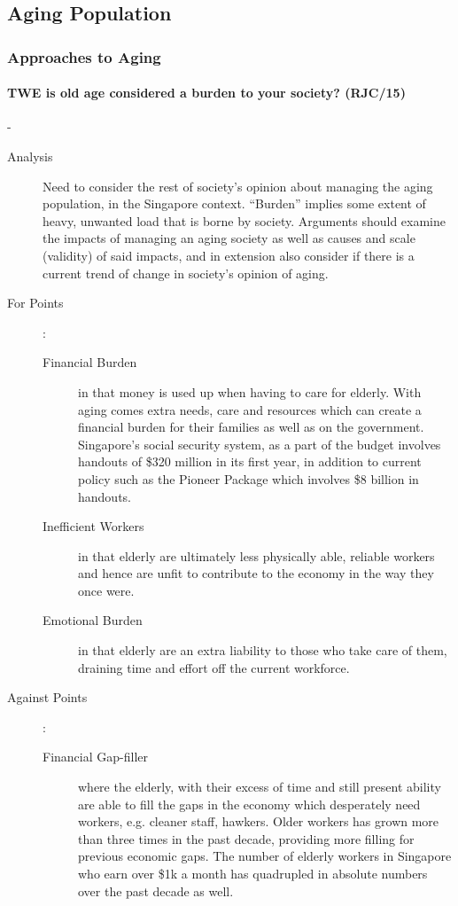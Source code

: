 \documentclass[../../main]{subfiles}
\begin{document}
\subsection{Aging Population}

\subsubsection{Approaches to Aging}

\paragraph{TWE is old age considered a burden to your society? (RJC/15)}-

\begin{description}
	\item[Analysis] Need to consider the rest of society's opinion about managing the aging population, in the Singapore context. ``Burden'' implies some extent of heavy, unwanted load that is borne by society. Arguments should examine the impacts of managing an aging society as well as causes and scale (validity) of said impacts, and in extension also consider if there is a current trend of change in society's opinion of aging.
	\item[For Points] :
		\begin{description}
			\item[Financial Burden] in that money is used up when having to care for elderly. With aging comes extra needs, care and resources which can create a financial burden for their families as well as on the government. Singapore's social security system, as a part of the budget involves handouts of \$320 million in its first year, in addition to current policy such as the Pioneer Package which involves \$8 billion in handouts.
			\item[Inefficient Workers] in that elderly are ultimately less physically able, reliable workers and hence are unfit to contribute to the economy in the way they once were.
			\item[Emotional Burden] in that elderly are an extra liability to those who take care of them, draining time and effort off the current workforce.
		\end{description}
	\item[Against Points] :
		\begin{description}
			\item[Financial Gap-filler] where the elderly, with their excess of time and still present ability are able to fill the gaps in the economy which desperately need workers, e.g. cleaner staff, hawkers. Older workers has grown more than three times in the past decade, providing more filling for previous economic gaps. The number of elderly workers in Singapore who earn over \$1k a month has quadrupled in absolute numbers over the past decade as well.

\end{description}
\end{description}
\end{document}

